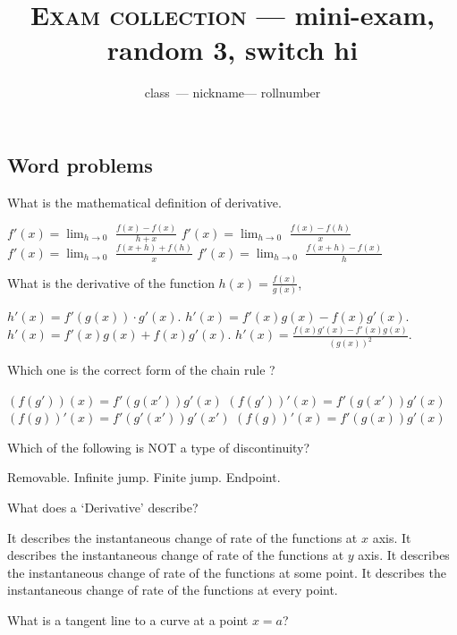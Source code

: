 \documentclass{exam}
\newcommand{\randomnumber}{3}
\newcommand{\switchnumber}{hi}
\newcommand{\class}{class}
\newcommand{\rollnumber}{rollnumber}
\newcommand{\nickname}{nickname}
\begin{document}
\author{\class\ --- \nickname --- \rollnumber}
\title{\textsc{Exam collection} --- mini-exam, random \randomnumber, switch \switchnumber }


\maketitle


\begin{questions}

\section{Word problems}

	\question What is the mathematical definition of derivative.

	\begin{choices}
		\choice $f'(x) = \lim_{h\to 0}$ $\frac{f(x)-f(x)}{h+x}$
		\choice $f'(x) = \lim_{h\to 0}$ $\frac{f(x)-f(h)}{x}$
		\choice $f'(x) = \lim_{h\to 0}$ $\frac{f(x+h)+f(h)}{x}$
		\CorrectChoice $f'(x) = \lim_{h\to 0}$ $\frac{f(x+h)-f(x)}{h}$
	\end{choices}
	\question What is the derivative of the function $h(x) = \frac{f(x)}{g(x)}$,

	\begin{choices}
		\choice $h'(x) = f'(g(x)) \cdot g'(x).$
		\choice $h'(x) = f'(x)g(x)-f(x)g'(x).$
		\choice $h'(x) = f'(x)g(x)+f(x)g'(x).$
		\CorrectChoice $h'(x) = \frac{f(x)g'(x)-f'(x)g(x)}{(g(x))^2}.$
	\end{choices}

	\question Which one is the correct form of the chain rule ?

	\begin{choices}
		\choice $(f(g'))(x)=f'(g(x'))g'(x)$
		\choice $(f(g'))'(x)=f'(g(x'))g'(x)$
		\choice $(f(g))'(x)=f'(g'(x'))g'(x')$
		\CorrectChoice $(f(g))'(x)=f'(g(x))g'(x)$
	\end{choices}

	\question Which of the following is NOT a type of discontinuity?

	\begin{choices}
		\choice Removable.
		\choice Infinite jump.
		\choice Finite jump.
		\CorrectChoice Endpoint.
	\end{choices}

	\question What does a `Derivative' describe?
	\begin{choices}
		\choice It describes the instantaneous change of rate of the functions at $x$ axis.
		\choice It describes the instantaneous change of rate of the functions at $y$ axis.
		\choice It describes the instantaneous change of rate of the functions at some point.
		\CorrectChoice It describes the instantaneous change of rate of the functions at every point.
	\end{choices}
	\question What is a tangent line to a curve at a point $x = a$?


\end{questions}
\end{document}
